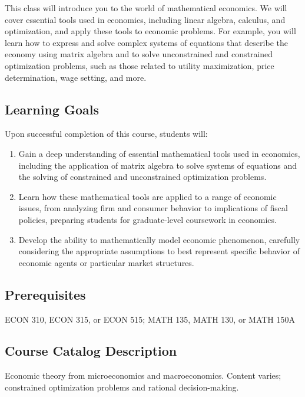 \documentclass{./../Latex/syllabus}
\begin{document}
This class will introduce you to the world of mathematical economics. We will cover essential tools used in economics, including linear algebra, calculus, and optimization, and apply these tools to economic problems.  For example, you will learn how to express and solve complex systems of equations that describe the economy using matrix algebra and to solve unconstrained and constrained optimization problems, such as those related to utility maximization, price determination, wage setting, and more.


\subsection*{Learning Goals}
Upon successful completion of this course, students will:
\begin{enumerate}
\itemsep0em 
  \item Gain a deep understanding of essential mathematical tools used in economics, including the application of matrix algebra to solve systems of equations and the solving of constrained and unconstrained optimization problems.
  \item Learn how these mathematical tools are applied to a range of economic issues, from analyzing firm and consumer behavior to implications of fiscal policies, preparing students for graduate-level coursework in economics.
  \item Develop the ability to mathematically model economic phenomenon, carefully considering the appropriate assumptions to best represent specific behavior of economic agents or particular market structures.
\end{enumerate}

\newpage
\subsection*{Prerequisites}
ECON 310, ECON 315, or ECON 515; MATH 135, MATH 130, or MATH 150A

\subsection*{Course Catalog Description}
Economic theory from microeconomics and macroeconomics. Content varies; constrained optimization problems and rational decision-making.
\end{document}
